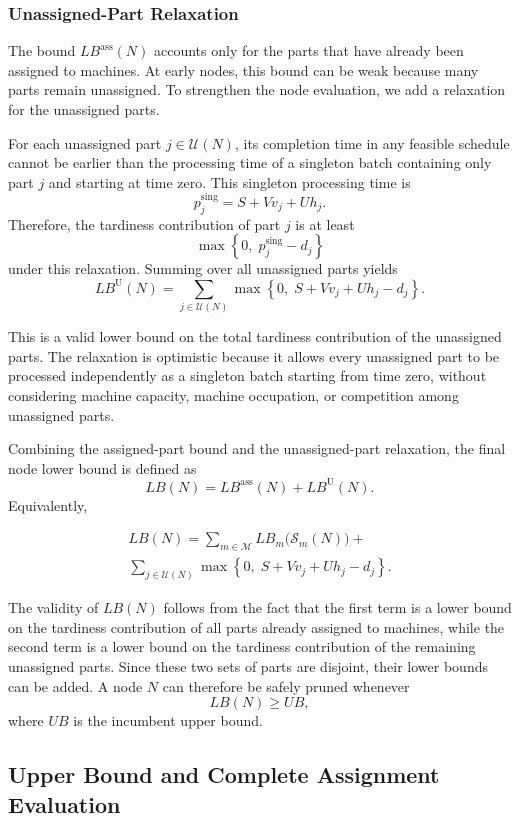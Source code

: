 \documentclass[review,3p,times,authoryear]{elsarticle}
\begin{document}
\subsubsection{Unassigned-Part Relaxation}

The bound $LB^{\mathrm{ass}}(N)$ accounts only for the parts that have
already been assigned to machines. At early nodes, this bound can be weak
because many parts remain unassigned. To strengthen the node evaluation, we
add a relaxation for the unassigned parts.

For each unassigned part $j\in\mathcal{U}(N)$, its completion time in any
feasible schedule cannot be earlier than the processing time of a singleton
batch containing only part $j$ and starting at time zero. This singleton
processing time is
\[
p_j^{\mathrm{sing}}
=
S+Vv_j+Uh_j.
\]
Therefore, the tardiness contribution of part $j$ is at least
\[
\max\left\{0,\;p_j^{\mathrm{sing}}-d_j\right\}
\]
under this relaxation. Summing over all unassigned parts yields
\[
LB^{\mathrm{U}}(N)
=
\sum_{j\in\mathcal{U}(N)}
\max\left\{0,\;S+Vv_j+Uh_j-d_j\right\}.
\]

This is a valid lower bound on the total tardiness contribution of the
unassigned parts. The relaxation is optimistic because it allows every
unassigned part to be processed independently as a singleton batch starting
from time zero, without considering machine capacity, machine occupation, or
competition among unassigned parts.

Combining the assigned-part bound and the unassigned-part relaxation, the
final node lower bound is defined as
\[
LB(N)
=
LB^{\mathrm{ass}}(N)
+
LB^{\mathrm{U}}(N).
\]
Equivalently,

\begin{align}
	LB(N)
	=
	\sum_{m\in\mathcal{M}}
	LB_m\bigl(\mathcal{S}_m(N)\bigr)
	+ \\
	\sum_{j\in\mathcal{U}(N)}
	\max\left\{0,\;S+Vv_j+Uh_j-d_j\right\}.
\end{align}

The validity of $LB(N)$ follows from the fact that the first term is a lower
bound on the tardiness contribution of all parts already assigned to
machines, while the second term is a lower bound on the tardiness
contribution of the remaining unassigned parts. Since these two sets of
parts are disjoint, their lower bounds can be added. A node $N$ can
therefore be safely pruned whenever
\[
LB(N)\ge UB,
\]
where $UB$ is the incumbent upper bound.


\subsection{Upper Bound and Complete Assignment Evaluation}
\label{subsec:ub_complete_eval}
\end{document}
